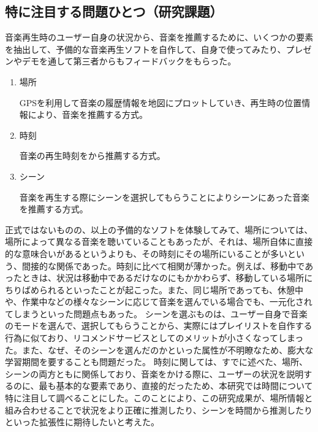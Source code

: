 \documentclass{jsarticle}
\begin{document}
\subsection{特に注目する問題ひとつ（研究課題）}
音楽再生時のユーザー自身の状況から、音楽を推薦するために、いくつかの要素を抽出して、予備的な音楽再生ソフトを自作して、自身で使ってみたり、プレゼンやデモを通して第三者からもフィードバックをもらった。
\begin{enumerate}
\item
場所

GPSを利用して音楽の履歴情報を地図にプロットしていき、再生時の位置情報により、音楽を推薦する方式。
\item
時刻

音楽の再生時刻をから推薦する方式。
\item
シーン

音楽を再生する際にシーンを選択してもらうことによりシーンにあった音楽を推薦する方式。
\end{enumerate}

正式ではないものの、以上の予備的なソフトを体験してみて、場所については、場所によって異なる音楽を聴いていることもあったが、それは、場所自体に直接的な意味合いがあるというよりも、その時刻にその場所にいることが多いという、間接的な関係であった。時刻に比べて相関が薄かった。例えば、移動中であったときは、状況は移動中であるだけなのにもかかわらず、移動している場所にちりばめられるといったことが起こった。また、同じ場所であっても、休憩中や、作業中などの様々なシーンに応じて音楽を選んでいる場合でも、一元化されてしまうといった問題点もあった。
シーンを選ぶものは、ユーザー自身で音楽のモードを選んで、選択してもらうことから、実際にはプレイリストを自作する行為に似ており、リコメンドサービスとしてのメリットが小さくなってしまった。また、なぜ、そのシーンを選んだのかといった属性が不明瞭なため、膨大な学習期間を要することも問題だった。
時刻に関しては、すでに述べた、場所、シーンの両方ともに関係しており、音楽をかける際に、ユーザーの状況を説明するのに、最も基本的な要素であり、直接的だったため、本研究では時間について特に注目して調べることにした。このことにより、この研究成果が、場所情報と組み合わせることで状況をより正確に推測したり、シーンを時間から推測したりといった拡張性に期待したいと考えた。
\end{document}
